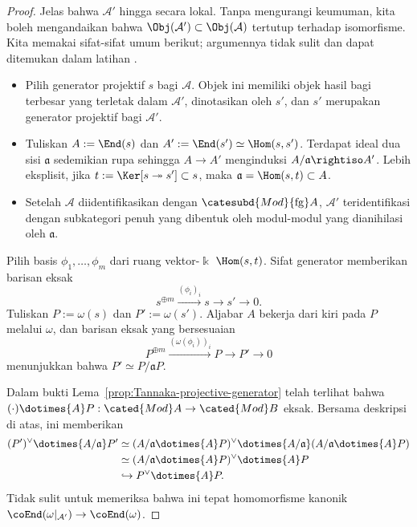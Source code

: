 \begin{proof}
	Jelas bahwa $\mathcal{A}'$ hingga secara lokal. Tanpa mengurangi keumuman, kita
	boleh mengandaikan bahwa $\Obj(\mathcal{A}')\subset\Obj(\mathcal{A})$
	tertutup terhadap isomorfisme. Kita memakai sifat-sifat umum berikut;
	argumennya tidak sulit dan dapat ditemukan dalam latihan
	.
	\begin{itemize}
		\item Pilih generator projektif $s$ bagi $\mathcal{A}$. Objek ini
		memiliki objek hasil bagi terbesar yang terletak dalam
		$\mathcal{A}'$, dinotasikan oleh $s'$, dan $s'$ merupakan generator
		projektif bagi $\mathcal{A}'$.
		\item Tuliskan $A:=\End(s)$ dan
		$A':=\End(s')\simeq\Hom(s,s')$. Terdapat ideal dua sisi
		$\mathfrak a$ sedemikian rupa sehingga $A\to A'$ menginduksi
		$A/\mathfrak a\rightiso A'$. Lebih eksplisit, jika
		$t:=\Ker[s\twoheadrightarrow s']\subset s$, maka
		$\mathfrak a=\Hom(s,t)\subset A$.
		\item Setelah $\mathcal{A}$ diidentifikasikan dengan
		$\catesubd{Mod}{\mathrm{fg}}A$, $\mathcal{A}'$ teridentifikasi dengan
		subkategori penuh yang dibentuk oleh modul-modul yang dianihilasi oleh
		$\mathfrak a$.
	\end{itemize}

	Pilih basis $\phi_1,\ldots,\phi_m$ dari ruang vektor-$\Bbbk$
	$\Hom(s,t)$. Sifat generator memberikan barisan eksak
	\[ s^{\oplus m} \xrightarrow{(\phi_i)_i} s \to s' \to 0. \]
	Tuliskan $P:=\omega(s)$ dan $P':=\omega(s')$. Aljabar $A$ bekerja dari
	kiri pada $P$ melalui $\omega$, dan barisan eksak yang bersesuaian
	\[ P^{\oplus m} \xrightarrow{(\omega(\phi_i))_i} P \to P' \to 0 \]
	menunjukkan bahwa $P'\simeq P/\mathfrak aP$.

	Dalam bukti Lema~\ref{prop:Tannaka-projective-generator} telah terlihat
	bahwa $(\mathord\cdot)\dotimes{A}P:\cated{Mod}A\to\cated{Mod}B$ eksak.
	Bersama deskripsi di atas, ini memberikan
	\begin{align*}
		(P')^\vee \dotimes{A/\mathfrak{a}} P' & \simeq (A/\mathfrak{a} \dotimes{A} P)^\vee \dotimes{A/\mathfrak{a}} ( A/\mathfrak{a} \dotimes{A} P) \\
		& \simeq (A/\mathfrak{a} \dotimes{A} P)^\vee \dotimes{A} P \\
		& \hookrightarrow P^\vee \dotimes{A} P.
	\end{align*}
	Tidak sulit untuk memeriksa bahwa ini tepat homomorfisme kanonik
	$\coEnd(\omega|_{\mathcal{A}'})\to\coEnd(\omega)$.
\end{proof}

